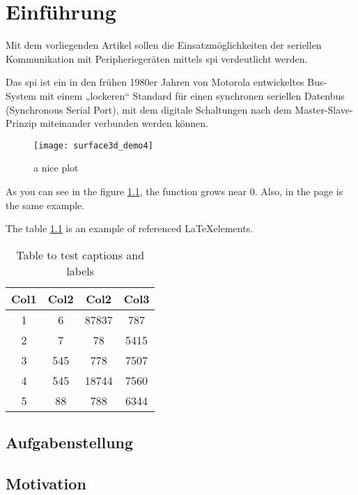 \chapter{Einführung}

Mit dem vorliegenden Artikel sollen die Einsatzmöglichkeiten der seriellen Kommunikation mit Peripheriegeräten mittels \gls{spi} verdeutlicht werden.

Das \gls{spi} ist ein in den frühen 1980er Jahren von Motorola entwickeltes Bus-System mit einem „lockeren“ Standard für einen synchronen seriellen Datenbus (Synchronous Serial Port), mit dem digitale Schaltungen nach dem Master-Slave-Prinzip miteinander verbunden werden können.

\begin{figure}[h]
    \centering
    \texttt{[image: surface3d\_demo4]}
    \caption{a nice plot}
    \label{fig:mesh1}
\end{figure}
 
As you can see in the figure \ref{fig:mesh1}, the function grows near 0. Also, in the page \pageref{fig:mesh1} is the same example.

The table \ref{table:1} is an example of referenced \LaTeX elements.
 
\begin{table}[!ht]
\centering
\begin{tabular}{||c c c c||} 
 \hline
 Col1 & Col2 & Col2 & Col3 \\ [0.5ex] 
 \hline\hline
 1 & 6 & 87837 & 787 \\ 
 2 & 7 & 78 & 5415 \\
 3 & 545 & 778 & 7507 \\
 4 & 545 & 18744 & 7560 \\
 5 & 88 & 788 & 6344 \\ [1ex] 
 \hline
\end{tabular}
\caption{Table to test captions and labels}
\label{table:1}
\end{table}

\section{Aufgabenstellung}

\section{Motivation}

